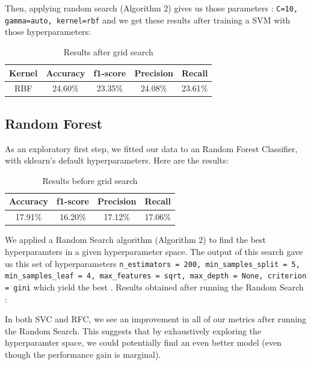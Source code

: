 \documentclass[twocolumn]{article}
\begin{document}
Then, applying random search (Algorithm 2) gives us those parameters : \texttt{C=10, gamma=auto, kernel=rbf} and we get these results after training a SVM with those hyperparameters:


\begin{table}[h]
    \centering
    \begin{tabular}{|c|c|c|c|c|}
    \hline
      Kernel & Accuracy & f1-score & Precision & Recall \\
      \hline
      RBF & 24.60\% & 23.35\% & 24.08\% & 23.61\% \\
    \hline
    \end{tabular}

    \label{tab:my_label}
    \caption{Results after grid search}
\end{table}

\subsection{Random Forest}
As an exploratory first step, we fitted our data to an Random Forest Classifier, with sklearn's default hyperparameters. Here are the results:

\begin{table}[h]
    \centering
    \begin{tabular}{|c|c|c|c|}
    \hline
      Accuracy & f1-score & Precision & Recall \\
      \hline
      17.91\% & 16.20\% & 17.12\% & 17.06\% \\
    \hline
    \end{tabular}

    \label{tab:my_label}
    \caption{Results before grid search}
\end{table}

We applied a Random Search algorithm (Algorithm 2) to find the best hyperparamters in a given hyperparameter space. The output of this search gave us this set of hyperparameters \texttt{n\_estimators = 200, min\_samples\_split = 5, min\_samples\_leaf = 4, max\_features = sqrt, max\_depth = None, criterion = gini} which yield the best . Results obtained after running the Random Search : 




In both SVC and RFC, we see an improvement in all of our metrics after running the Random Search. This suggests that by exhaustively exploring the hyperparamter space, we could potentially find an even better model (even though the performance gain is marginal).  
\end{document}
